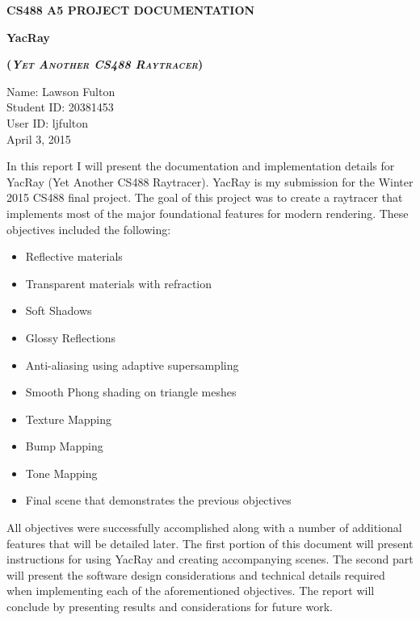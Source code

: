 \documentclass[12pt]{article}
\begin{document}

\begin{singlespace}
\begin{titlepage}

\begin{center}
\large

\textbf{\MakeUppercase{CS488 A5 Project Documentation}}
\vfill  

{
\Large
\textbf{YacRay}
}

 {
        \large
	\textsc{\textbf{(\textit{Yet Another CS488 Raytracer})}}
 }

\vfill
{
\small
Name: Lawson Fulton\\
Student ID: 20381453\\
User ID: ljfulton\\
April 3, 2015\\
}
\end{center}
  \end{titlepage}
  \end{singlespace}

\dotableofcontents
\newpage
{}

In this report I will present the documentation and implementation details for YacRay (Yet Another CS488 Raytracer). YacRay is my submission for the Winter 2015 CS488 final project. The goal of this project was to create a raytracer that implements most of the major foundational features for modern rendering. These objectives included the following:

\begin{itemize} \itemsep1pt \parskip0pt 

\item Reflective materials
\item Transparent materials with refraction
\item Soft Shadows
\item Glossy Reflections
\item Anti-aliasing using adaptive supersampling
\item Smooth Phong shading on triangle meshes
\item Texture Mapping
\item Bump Mapping
\item Tone Mapping
\item Final scene that demonstrates the previous objectives

\end{itemize}

All objectives were successfully accomplished along with a number of additional features that will be detailed later. The first portion of this document will present instructions for using YacRay and creating accompanying scenes. The second part will present the software design considerations and technical details required when implementing each of the aforementioned objectives. The report will conclude by presenting results and considerations for future work.
\end{document}
